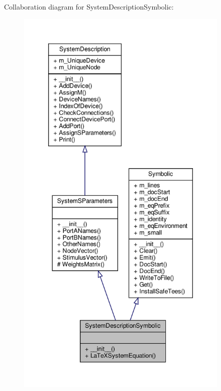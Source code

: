 Collaboration diagram for System\+Description\+Symbolic\+:
\nopagebreak
\begin{figure}[H]
\begin{center}
\leavevmode
\includegraphics[height=550pt]{classSignalIntegrity_1_1SystemDescriptions_1_1SystemDescriptionSymbolic_1_1SystemDescriptionSymbolic__coll__graph}
\end{center}
\end{figure}

